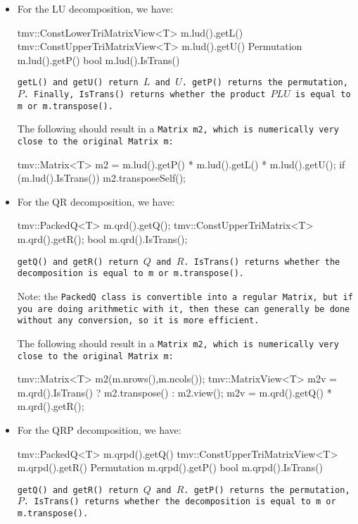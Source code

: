 \begin{itemize}
\item
For the LU decomposition, we have:
\begin{tmvcode}
tmv::ConstLowerTriMatrixView<T> m.lud().getL()
tmv::ConstUpperTriMatrixView<T> m.lud().getU()
Permutation m.lud().getP()
bool m.lud().IsTrans()
\end{tmvcode}
\tt{getL()} and \tt{getU()} return $L$ and $U$.
\tt{getP()} returns the permutation, $P$.
Finally, \tt{IsTrans()} returns whether
the product $PLU$ is equal to \tt{m} or \tt{m.transpose()}.  

The following should result in a \tt{Matrix m2}, which is numerically very close to
the original \tt{Matrix m}:
\begin{tmvcode}
tmv::Matrix<T> m2 = m.lud().getP() * m.lud().getL() * m.lud().getU();
if (m.lud().IsTrans()) m2.transposeSelf();
\end{tmvcode}

\item
For the QR decomposition, we have:
\begin{tmvcode}
tmv::PackedQ<T> m.qrd().getQ();
tmv::ConstUpperTriMatrix<T> m.qrd().getR();
bool m.qrd().IsTrans();
\end{tmvcode}
\tt{getQ()} and \tt{getR()} return $Q$ and $R$.  
\tt{IsTrans()} returns whether
the decomposition is equal to \tt{m} or \tt{m.transpose()}.  

Note: the \tt{PackedQ} class is convertible into a regular \tt{Matrix}, but if you are doing 
arithmetic with it, then these can generally be done without any conversion,
so it is more efficient.

The following should result in a \tt{Matrix m2}, which is numerically very close to
the original \tt{Matrix m}:
\begin{tmvcode}
tmv::Matrix<T> m2(m.nrows(),m.ncols());
tmv::MatrixView<T> m2v = 
      m.qrd().IsTrans() ? m2.transpose() : m2.view();
m2v = m.qrd().getQ() * m.qrd().getR();
\end{tmvcode}

\item
For the QRP decomposition, we have:
\begin{tmvcode}
tmv::PackedQ<T> m.qrpd().getQ()
tmv::ConstUpperTriMatrixView<T> m.qrpd().getR()
Permutation m.qrpd().getP()
bool m.qrpd().IsTrans()
\end{tmvcode}
\tt{getQ()} and \tt{getR()} return $Q$ and $R$.
\tt{getP()} returns the permutation, $P$.
\tt{IsTrans()} returns whether
the decomposition is equal to \tt{m} or \tt{m.transpose()}.  


\end{itemize}
